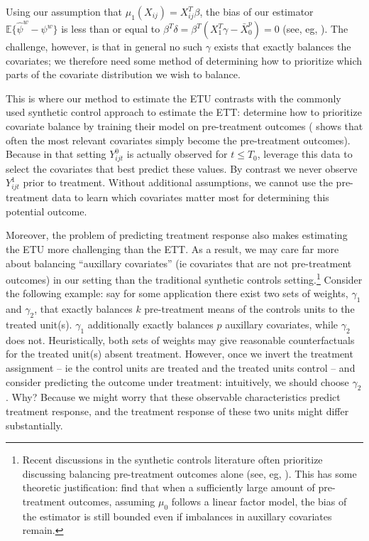\documentclass[12pt]{article}
\begin{document}
Using our assumption that $\mu_1(X_{ij}) = X_{ij}^T\beta$, the bias of our estimator $\mathbb{E}\{\hat{\psi}^w - \psi^w\}$ is less than or equal to $\beta^T \delta = \beta^T(X_1^T\gamma - \bar{X}_0^p) = 0$ (see, eg, \cite{zubizarreta2015stable}). The challenge, however, is that in general no such $\gamma$ exists that exactly balances the covariates; we therefore need some method of determining how to prioritize which parts of the covariate distribution we wish to balance.

This is where our method to estimate the ETU contrasts with the commonly used synthetic control approach to estimate the ETT: \cite{abadie2010synthetic} determine how to prioritize covariate balance by training their model on pre-treatment outcomes (\cite{kaul2015synthetic} shows that often the most relevant covariates simply become the pre-treatment outcomes). Because in that setting $Y^0_{ijt}$ is actually observed for $t \le T_0$, \cite{abadie2010synthetic} leverage this data to select the covariates that best predict these values. By contrast we never observe $Y^1_{ijt}$ prior to treatment. Without additional assumptions, we cannot use the pre-treatment data to learn which covariates matter most for determining this potential outcome.

Moreover, the problem of predicting treatment response also makes estimating the ETU more challenging than the ETT. As a result, we may care far more about balancing ``auxillary covariates'' (ie covariates that are not pre-treatment outcomes) in our setting than the traditional synthetic controls setting.\footnote{Recent discussions in the synthetic controls literature often prioritize discussing balancing pre-treatment outcomes alone (see, eg, \cite{doudchenko2016balancing}). This has some theoretic justification: \cite{botosaru2019role} find that when a sufficiently large amount of pre-treatment outcomes, assuming $\mu_0$ follows a linear factor model, the bias of the estimator is still bounded even if imbalances in auxillary covariates remain.} Consider the following example: say for some application there exist two sets of weights, $\gamma_1$ and $\gamma_2$, that exactly balances $k$ pre-treatment means of the controls units to the treated unit(s). $\gamma_1$ additionally exactly balances $p$ auxillary covariates, while $\gamma_2$ does not. Heuristically, both sets of weights may give reasonable counterfactuals for the treated unit(s) absent treatment. However, once we invert the treatment assignment -- ie the control units are treated and the treated units control -- and consider predicting the outcome under treatment: intuitively, we should choose $\gamma_2$. Why? Because we might worry that these observable characteristics predict treatment response, and the treatment response of these two units might differ substantially. 
\end{document}
